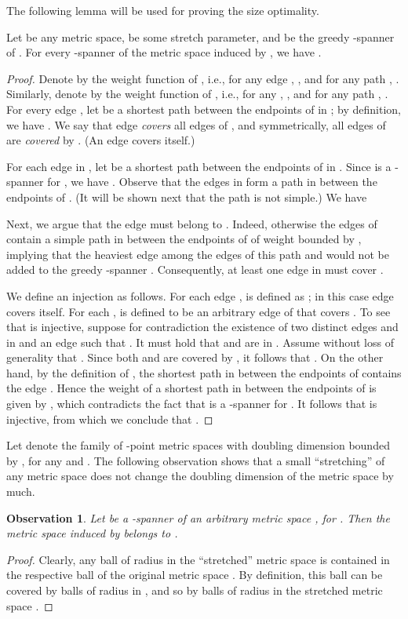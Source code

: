 \documentclass[11pt,letterpaper]{article}
\newtheorem{observation}[lemma]{Observation}
\begin{document}
The following lemma will be used  for proving the size optimality.
\begin{lemma}\label{lem:metric_spars}
	Let  be any metric space,  be some stretch parameter, and  be the greedy -spanner of .
	For every -spanner  of the metric space  induced by , we have .
\end{lemma}
\begin{proof}
	Denote by  the weight function of , i.e., for any edge , ,
	and for any path , .
	Similarly, denote by  the weight function of , i.e., for any , ,
	and for any path , .
	For every edge , let  be a shortest path between the endpoints of  in ; by definition, we have .
	We say that edge  \emph{covers} all edges of , and symmetrically, all edges of  are \emph{covered} by .
	(An edge  covers itself.)
	
	For each edge  in , let  be a shortest path
	between the endpoints of  in . Since  is a -spanner for , we have .
	Observe that the edges in  form a  path  in  between the endpoints of .
	(It will be shown next that the path  is not simple.)
	We have
	
	
	
	Next, we argue that the edge  must belong to .
	Indeed, otherwise the edges of
	 contain a simple path in  between the endpoints of  of weight bounded by ,
	implying that the heaviest edge among the edges of this path and  would not be added to the greedy -spanner .
	Consequently, at least one edge  in  must cover .
	
	We define an injection  as follows. For each edge ,  is defined as ; in this case edge  covers itself.
	For each ,  is defined to be an arbitrary edge of  that covers .
	To see that  is injective, suppose for contradiction the existence of two distinct edges  and  in 
	and an edge 	such that . It must hold that  and  are in .
	Assume without loss of generality that .
	Since both  and  are covered by , it follows that .
	On the other hand, by the definition of , the shortest path  in  between the endpoints of  contains the edge .
	Hence the weight of a shortest path in  between the endpoints of  is given by , which contradicts	the fact that  is a -spanner for . It follows that  is injective, from which we conclude that  .
\end{proof}

Let  denote the family of -point metric spaces with doubling dimension bounded by ,
for any  and .
The following observation shows that a small ``stretching'' of any metric space does not change the doubling dimension of the metric space by much.
\begin{observation}\label{lem:doubling_embedding}
	Let  be a -spanner of an arbitrary metric space , for .
	Then the metric space  induced by  belongs to .
\end{observation}
\begin{proof}
	Clearly, any ball of radius  in the ``stretched'' metric space  is contained in the respective ball of the original metric space .
	By definition, this ball can be covered by  balls of radius  in ,
	and so by  balls of radius  in the stretched metric space .
\end{proof}	
\end{document}
